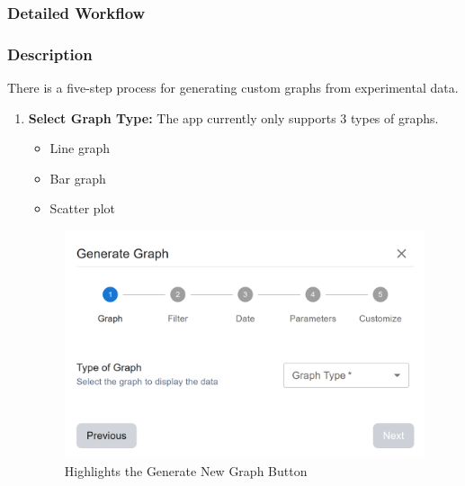 \documentclass[12pt]{article}
\begin{document}
\subsubsection{Detailed Workflow}
\subsubsection*{Description}
There is a five-step process for generating custom graphs from experimental data.

\begin{enumerate}
    \item \textbf{Select Graph Type:} \newline
    The app currently only supports 3 types of graphs. 
    \begin{itemize}
        \item Line graph 
        \item Bar graph 
        \item Scatter plot
    \end{itemize}
    \begin{figure}[H]
        \centering
        \includegraphics[scale=0.4]{./Diagrams/graph-form .png}
        \caption{Highlights the Generate New Graph Button}
        \label{fig:example}
    \end{figure}


\end{enumerate}
\end{document}
